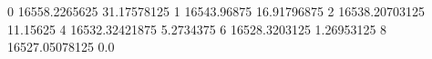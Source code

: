 0 16558.2265625 31.17578125
1 16543.96875 16.91796875
2 16538.20703125 11.15625
4 16532.32421875 5.2734375
6 16528.3203125 1.26953125
8 16527.05078125 0.0
